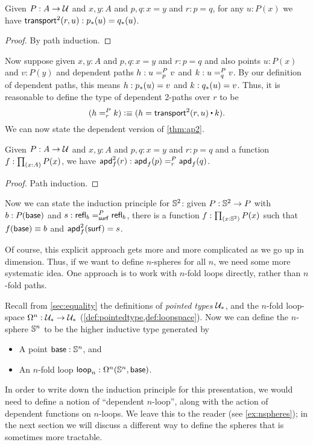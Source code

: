 \begin{lem}\label{thm:transport2}
  Given $P:A\to\type$ and $x,y:A$ and $p,q:x=y$ and $r:p=q$, for any $u:P(x)$ we have $\transtwo r u : \trans p u = \trans q u$.
\end{lem}
\begin{proof}
  By path induction.
\end{proof}

Now suppose given $x,y:A$ and $p,q:x=y$ and $r:p=q$ and also points $u:P(x)$ and $v:P(y)$ and dependent paths $h:\dpath P p u v$ and $k:\dpath P q u v$.
By our definition of dependent paths, this means $h:\trans p u = v$ and $k:\trans q u = v$.
Thus, it is reasonable to define the type of dependent 2-paths over $r$ to be
\[ (\dpath P r h k )\defeq (h = \transtwo r u \ct k). \]
We can now state the dependent version of \autoref{thm:ap2}.

\begin{lem}\label{thm:apd2}
  Given $P:A\to\type$ and $x,y:A$ and $p,q:x=y$ and $r:p=q$ and a function $f:\prd{x:A} P(x)$, we have
  $\apdtwo f r : \dpath P r {\apd f p}{\apd f q}$.
\end{lem}
\begin{proof}
  Path induction.
\end{proof}

%
Now we can state the induction principle for $\Sn^2$: given $P:\Sn^2\to P$ with $b:P(\base)$ and $s:\dpath P \surf {\refl b}{\refl b}$, there is a function $f:\prd{x:\Sn^2} P(x)$ such that $f(\base)\jdeq b$ and $\apdtwo f \surf = s$.

Of course, this explicit approach gets more and more complicated as we go up in dimension.
Thus, if we want to define $n$-spheres for all $n$, we need some more systematic idea.
One approach is to work with $n$-fold loops directly, rather than $n$-fold paths.

Recall from \autoref{sec:equality} the definitions of \emph{pointed types} $\type_*$, and the $n$-fold loop-space $\Omega^n : \type_* \to \type_*$
(\cref{def:pointedtype,def:loopspace}).  Now we can define the
$n$-sphere $\Sn^n$ to be the higher inductive type generated by
\begin{itemize}
\item A point $\base:\Sn^n$, and
\item An $n$-fold loop $\lloop_n : \Omega^n(\Sn^n,\base)$.
\end{itemize}
In order to write down the induction principle for this presentation, we would need to define a notion of ``dependent $n$-loop'', along with the action of dependent functions on $n$-loops.
We leave this to the reader (see \autoref{ex:nspheres}); in the next section we will discuss a different way to define the spheres that is sometimes more tractable.


